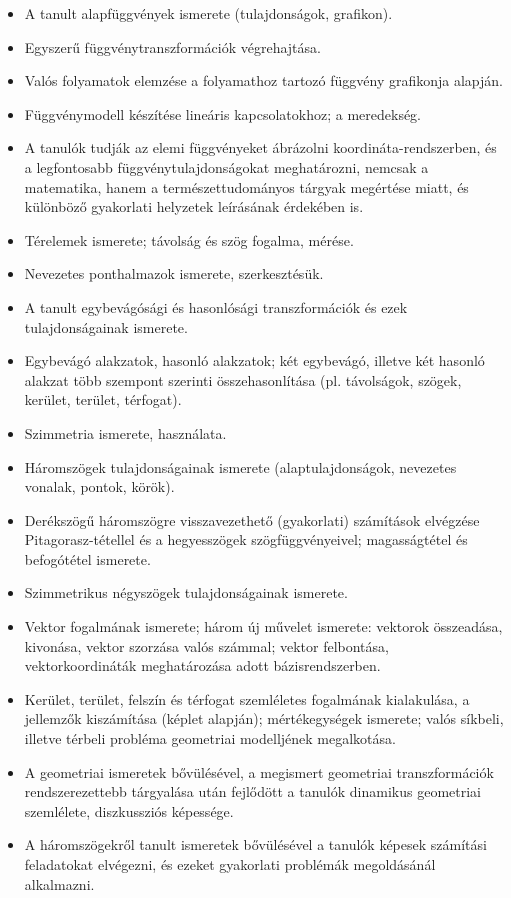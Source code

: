 \begin{itemize}
\item A tanult alapfüggvények ismerete (tulajdonságok, grafikon).
\item Egyszerű függvénytranszformációk végrehajtása.
\item Valós folyamatok elemzése a folyamathoz tartozó függvény grafikonja alapján.
\item Függvénymodell készítése lineáris kapcsolatokhoz; a meredekség.
\item A tanulók tudják az elemi függvényeket ábrázolni koordináta-rendszerben, és a legfontosabb függvénytulajdonságokat meghatározni, nemcsak a matematika, hanem a természettudományos tárgyak megértése miatt, és különböző gyakorlati helyzetek leírásának érdekében is.
\item Térelemek ismerete; távolság és szög fogalma, mérése.
\item Nevezetes ponthalmazok ismerete, szerkesztésük.
\item A tanult egybevágósági és hasonlósági transzformációk és ezek tulajdonságainak ismerete.
\item Egybevágó alakzatok, hasonló alakzatok; két egybevágó, illetve két hasonló alakzat több szempont szerinti összehasonlítása (pl. távolságok, szögek, kerület, terület, térfogat).
\item Szimmetria ismerete, használata.
\item Háromszögek tulajdonságainak ismerete (alaptulajdonságok, nevezetes vonalak, pontok, körök).
\item Derékszögű háromszögre visszavezethető (gyakorlati) számítások elvégzése Pitagorasz-tétellel és a hegyesszögek szögfüggvényeivel; magasságtétel és befogótétel ismerete.
\item Szimmetrikus négyszögek tulajdonságainak ismerete.
\item Vektor fogalmának ismerete; három új művelet ismerete: vektorok összeadása, kivonása, vektor szorzása valós számmal; vektor felbontása, vektorkoordináták meghatározása adott bázisrendszerben.
\item Kerület, terület, felszín és térfogat szemléletes fogalmának kialakulása, a jellemzők kiszámítása (képlet alapján); mértékegységek ismerete; valós síkbeli, illetve térbeli probléma geometriai modelljének megalkotása.
\item A geometriai ismeretek bővülésével, a megismert geometriai transzformációk rendszerezettebb tárgyalása után fejlődött a tanulók dinamikus geometriai szemlélete, diszkussziós képessége.
\item A háromszögekről tanult ismeretek bővülésével a tanulók képesek számítási feladatokat elvégezni, és ezeket gyakorlati problémák megoldásánál alkalmazni.

\end{itemize}
